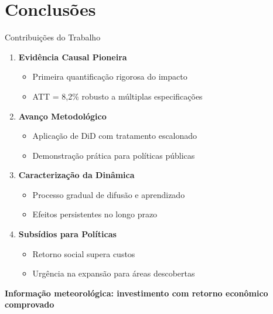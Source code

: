 \documentclass[10pt,aspectratio=169]{beamer}
\begin{document}
\section{Conclusões}

\begin{frame}{Contribuições do Trabalho}
\begin{enumerate}
    \item \textbf{Evidência Causal Pioneira}
    \begin{itemize}
        \item Primeira quantificação rigorosa do impacto
        \item ATT = 8,2\% robusto a múltiplas especificações
    \end{itemize}
    
    \vspace{0.3cm}
    \item \textbf{Avanço Metodológico}
    \begin{itemize}
        \item Aplicação de DiD com tratamento escalonado
        \item Demonstração prática para políticas públicas
    \end{itemize}
    
    \vspace{0.3cm}
    \item \textbf{Caracterização da Dinâmica}
    \begin{itemize}
        \item Processo gradual de difusão e aprendizado
        \item Efeitos persistentes no longo prazo
    \end{itemize}
    
    \vspace{0.3cm}
    \item \textbf{Subsídios para Políticas}
    \begin{itemize}
        \item Retorno social supera custos
        \item Urgência na expansão para áreas descobertas
    \end{itemize}
\end{enumerate}

\begin{center}
\textbf{Informação meteorológica: investimento com retorno econômico comprovado}
\end{center}
\end{frame}
\end{document}
